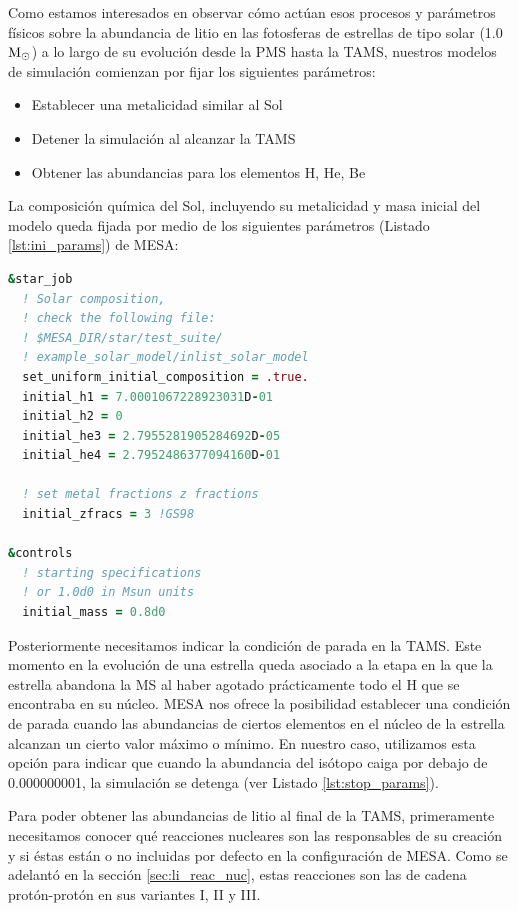 Como estamos interesados en observar cómo actúan esos procesos y parámetros físicos sobre la abundancia de litio en las fotosferas de estrellas de tipo solar (1.0 $\mathrm{M}_\odot$) a lo largo de su evolución desde la PMS hasta la TAMS, nuestros modelos de simulación comienzan por fijar los siguientes parámetros:

\begin{itemize}
    \item Establecer una metalicidad similar al Sol
    \item Detener la simulación al alcanzar la TAMS
    \item Obtener las abundancias para los elementos H, He, Be
\end{itemize}

La composición química del Sol, incluyendo su metalicidad y masa inicial del modelo queda fijada por medio de los siguientes parámetros (Listado \ref{lst:ini_params}) de MESA:

\begin{lstlisting}[language=Fortran, float, caption={Parametrización de la masa inicial de la estrella}, label={lst:ini_params}]
&star_job
  ! Solar composition, 
  ! check the following file:
  ! $MESA_DIR/star/test_suite/
  ! example_solar_model/inlist_solar_model
  set_uniform_initial_composition = .true.
  initial_h1 = 7.0001067228923031D-01
  initial_h2 = 0
  initial_he3 = 2.7955281905284692D-05
  initial_he4 = 2.7952486377094160D-01

  ! set metal fractions z fractions
  initial_zfracs = 3 !GS98

&controls
  ! starting specifications
  ! or 1.0d0 in Msun units
  initial_mass = 0.8d0 
\end{lstlisting}

Posteriormente necesitamos indicar la condición de parada en la TAMS. Este momento en la evolución de una estrella queda asociado a la etapa en la que la estrella abandona la MS al haber agotado prácticamente todo el H que se encontraba en su núcleo. MESA nos ofrece la posibilidad establecer una condición de parada cuando las abundancias de ciertos elementos en el núcleo de la estrella alcanzan un cierto valor máximo o mínimo. En nuestro caso, utilizamos esta opción para indicar que cuando la abundancia del isótopo  caiga por debajo de 0.000000001, la simulación se detenga (ver Listado \ref{lst:stop_params}).\par

Para poder obtener las abundancias de litio al final de la TAMS, primeramente necesitamos conocer qué reacciones nucleares son las responsables de su creación y si éstas están o no incluidas por defecto en la configuración de MESA. Como se adelantó en la sección \ref{sec:li_reac_nuc}, estas reacciones son las de cadena protón-protón en sus variantes I, II y III.\par


